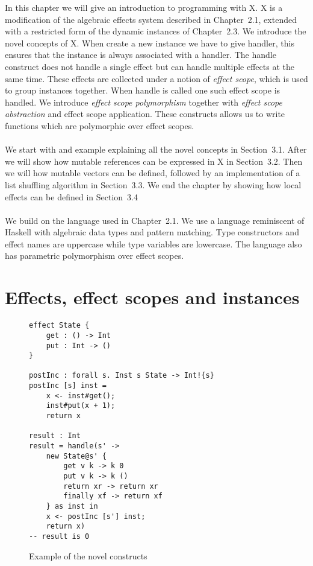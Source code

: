 \iffalse
\fi

In this chapter we will give an introduction to programming with X.
X is a modification of the algebraic effects system described in Chapter~2.1, extended with a restricted form of the dynamic instances of Chapter~2.3.
We introduce the novel concepts of X.
When create a new instance we have to give handler, this ensures that the instance is always associated with a handler.
The handle construct does not handle a single effect but can handle multiple effects at the same time.
These effects are collected under a notion of \emph{effect scope}, which is used to group instances together.
When handle is called one such effect scope is handled.
We introduce \emph{effect scope polymorphism} together with \emph{effect scope abstraction} and {effect scope application}.
These constructs allows us to write functions which are polymorphic over effect scopes.
\\\\
We start with and example explaining all the novel concepts in Section~3.1.
After we will show how mutable references can be expressed in X in Section~3.2.
Then we will how mutable vectors can be defined, followed by an implementation of a list shuffling algorithm in Section~3.3.
We end the chapter by showing how local effects can be defined in Section~3.4
\\\\
We build on the language used in Chapter~2.1.
We use a language reminiscent of Haskell with algebraic data types and pattern matching.
Type constructors and effect names are uppercase while type variables are lowercase.
The language also has parametric polymorphism over effect scopes.

\section{Effects, effect scopes and instances}
\label{section:basics}

\begin{figure}
\caption{Example of the novel constructs}
\begin{verbatim}
effect State {
	get : () -> Int
	put : Int -> ()
}

postInc : forall s. Inst s State -> Int!{s}
postInc [s] inst =
	x <- inst#get();
	inst#put(x + 1);
	return x

result : Int
result = handle(s' ->
	new State@s' {
		get v k -> k 0
		put v k -> k ()
		return xr -> return xr
		finally xf -> return xf
	} as inst in
	x <- postInc [s'] inst;
	return x)
-- result is 0
\end{verbatim}
\label{fig:example1}
\end{figure}

